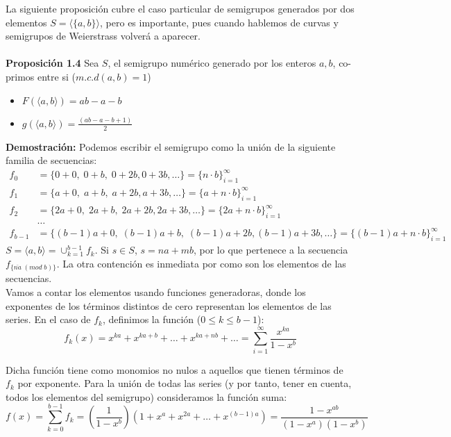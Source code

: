 \documentclass[11pt,spanish]{book}
\begin{document}
La siguiente proposición cubre el caso particular de semigrupos generados por dos elementos $S=\langle \{a,b\}\rangle$, pero es importante, pues cuando hablemos de curvas y semigrupos de Weierstrass volverá a aparecer.\\
\\ \hypertarget{semigrupo2elemntos}{\textbf{Proposición 1.4}} Sea $S$, el semigrupo numérico generado por los enteros $a,b$, co-primos entre si ($m.c.d(a,b)=1$)
\begin{itemize}
    \item $F(\langle a,b \rangle) = ab -a -b$
    \item $g(\langle a,b\rangle) = \frac{(ab-a-b+1)}{2}$
\end{itemize}
\textbf{Demostración:}
Podemos escribir el semigrupo como la unión de la siguiente familia de secuencias:
\begin{align*}
f_0 &= \{0+0,\;0+b,\;0+2b,0+3b,\ldots \}=\{n\cdot b\}_{i=1}^{\infty}\\
f_1 &= \{a+0,\;a+b,\;a+2b,a+3b,\ldots \}=\{a+n\cdot b\}_{i=1}^{\infty}\\
f_2 &= \{2a+0,\;2a+b,\;2a+2b,2a+3b,\ldots \}=\{2a+n\cdot b\}_{i=1}^{\infty}\\
&\ldots\\
f_{b-1} &= \{(b-1)a+0,\;(b-1)a+b,\;(b-1)a+2b,(b-1)a+3b,\ldots \}=\{(b-1)a+n\cdot b\}_{i=1}^{\infty }
\end{align*}
$S=\langle a,b\rangle =\cup_{k=1}^{b-1}f_k$. Si $s\in S$, $s=na+mb$, por lo que pertenece a la secuencia $f_{\{\overline{na}\;(mod\; b)\}}$. La otra contención es inmediata por como son los elementos de las secuencias.\\

Vamos a contar los elementos usando funciones generadoras, donde los exponentes de los términos distintos de cero representan los elementos de las series. En el caso de $f_{k}$, definimos la función ($0\leq k\leq b-1$):
$$ f_{k}(x) = x^{ka} +x^{ka+b}+\ldots +x^{ka+nb}+\ldots=\sum_{i=1}^{\infty} \frac{x^{ka}}{1-x^{b}}$$

Dicha función tiene como monomios no nulos a aquellos que tienen términos de $f_k$ por exponente. Para la unión de todas las series (y por tanto, tener en cuenta, todos los elementos del semigrupo) consideramos la función suma:
$$f(x)=\sum_{k=0}^{b-1}f_k=(\frac{1}{1-x^b})(1+x^a+x^{2a}+\ldots+x^{(b-1)a})=\frac{1-x^{ab}}{(1-x^{a})(1-x^{b})}$$
\end{document}
